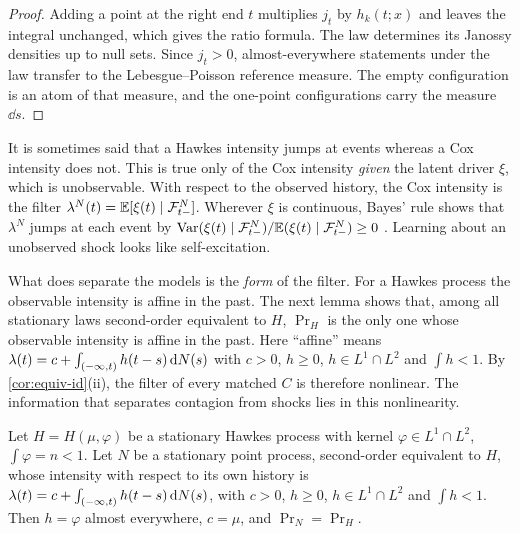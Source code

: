 \begin{proof}
Adding a point at the right end $t$ multiplies $j_t$ by $h_k(t;x)$ and leaves the
integral unchanged, which gives the ratio formula. The law determines its Janossy
densities up to null sets. Since $j_t>0$, almost-everywhere statements under the law
transfer to the Lebesgue--Poisson reference measure. The empty configuration is an atom
of that measure, and the one-point configurations carry the measure $\dd s$.
\end{proof}

\begin{remark}\label{rem:th-filter}
It is sometimes said that a Hawkes intensity jumps at events whereas a Cox intensity
does not. This is true only of the Cox intensity \emph{given} the latent driver $\xi$,
which is unobservable. With respect to the observed history, the Cox intensity is the
filter $\lambda^N(t)=\mathbb{E}[\xi(t)\mid\mathcal{F}^N_{t-}]$. Wherever $\xi$ is continuous, Bayes'
rule shows that $\lambda^N$ jumps at each event by
$\operatorname{Var}(\xi(t)\mid\mathcal{F}^N_{t-})/\mathbb{E}(\xi(t)\mid\mathcal{F}^N_{t-})\ge0$ \citep[cf.][]{bremaud1981}.
Learning about an unobserved shock looks like self-excitation.

What does separate the models is the \emph{form} of the filter. For a Hawkes process
the observable intensity is affine in the past. The next lemma shows that, among
all stationary laws second-order equivalent to $H$, $\Pr_H$ is the only one whose
observable intensity is affine in the past. Here ``affine'' means
$\lambda(t)=c+\int_{(-\infty,t)}h(t-s)\,\mathrm{d}N(s)$ with $c>0$, $h\ge0$,
$h\in L^1\cap L^2$ and $\int h<1$. By \cref{cor:equiv-id}(ii),
the filter of every matched $C$ is therefore nonlinear. The information that separates
contagion from shocks lies in this nonlinearity.
\end{remark}

\begin{lemma}\label{lem:th-affine}
Let $H=H(\mu,\varphi)$ be a stationary Hawkes process with kernel
$\varphi\in L^1\cap L^2$, $\int\varphi=n<1$. Let $N$ be a stationary point process,
second-order equivalent to $H$, whose intensity with respect to its own history is
$\lambda(t)=c+\int_{(-\infty,t)}h(t-s)\,\mathrm{d}N(s)$, with $c>0$, $h\ge0$,
$h\in L^1\cap L^2$ and $\int h<1$. Then $h=\varphi$ almost everywhere, $c=\mu$, and
$\Pr_N=\Pr_H$.
\end{lemma}

